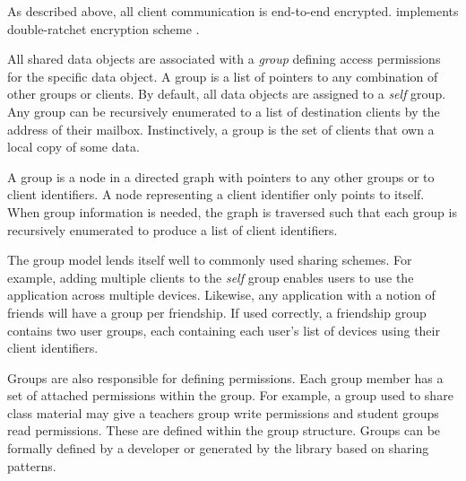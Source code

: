 
As described above, all client communication is end-to-end encrypted. \name{} implements double-ratchet encryption scheme \cite{signal,matrix}. 
 

All shared data objects are associated with a \textit{group} defining access permissions for the specific data object. A group is a list of pointers to any combination of other groups or clients. By default, all \name{} data objects are assigned to a \textit{self} group. Any group can be recursively enumerated to a list of destination clients by the address of their mailbox. Instinctively, a group is the set of clients that own a local copy of some data.

A group is a node in a directed graph with pointers to any other groups or to client identifiers. A node representing a client identifier only points to itself. When group information is needed, the graph is traversed such that each group is recursively enumerated to produce a list of client identifiers. 

The group model lends itself well to commonly used sharing schemes. For example, adding multiple clients to the \textit{self} group enables users to use the application across multiple devices. Likewise, any application with a notion of friends will have a group per friendship. If used correctly, a friendship group contains two user groups, each containing each user's list of devices using their client identifiers.

Groups are also responsible for defining permissions. Each group member has a set of attached permissions within the group. For example, a group used to share class material may give a teachers group write permissions and student groups read permissions. These are defined within the group structure. Groups can be formally defined by a developer or generated by the library based on sharing patterns.

